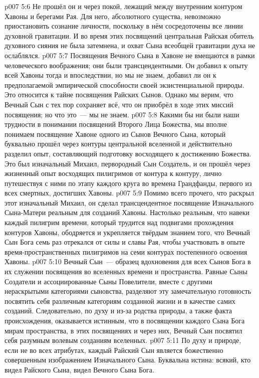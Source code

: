 \vs p007 5:6 Не прошёл он и через покой, лежащий между внутренним контуром Хавоны и берегами Рая. Для него, абсолютного существа, невозможно приостановить сознание личности, поскольку в нём сосредоточены все линии духовной гравитации. И во время этих посвящений центральная Райская обитель духовного сияния не была затемнена, и охват Сына всеобщей гравитации духа не ослаблялся.
\vs p007 5:7 \pc Посвящения Вечного Сына в Хавоне не вмещаются в рамки человеческого воображения; они были трансцендентными. Он добавил к опыту всей Хавоны тогда и впоследствии, но мы не знаем, добавил ли он к предполагаемой эмпирической способности своей экзистенциальной природы. Это относится к тайне посвящения Райских Сынов. Однако мы верим, что Вечный Сын с тех пор сохраняет всё, что он приобрёл в ходе этих миссий посвящения; но что это~--- мы не знаем.
\vs p007 5:8 \pc Какими бы ни были наши трудности в понимании посвящений Второго Лица Божества, мы вполне понимаем посвящение Хавоне одного из Сынов Вечного Сына, который буквально прошёл через контуры центральной вселенной и действительно разделил опыт, составляющий подготовку восходящего к достижению Божества. Это был изначальный Михаил, первородный Сын Создатель, и он прошёл через жизненный опыт восходящих пилигримов от контура к контуру, лично путешествуя с ними по этапу каждого круга во времена Грандфанды, первого из всех смертных, достигших Хавоны.
\vs p007 5:9 Помимо всего прочего, что раскрыл этот изначальный Михаил, он сделал трансцендентное посвящение Изначального Сына\hyp{}Матери реальным для созданий Хавоны. Настолько реальным, что навеки каждый пилигрим времени, который трудится над подвигами прохождения контуров Хавоны, ободряется и укрепляется твёрдым знанием того, что Вечный Сын Бога семь раз отрекался от силы и славы Рая, чтобы участвовать в опыте время\hyp{}пространственных пилигримов на семи контурах постепенного освоения Хавоны.
\vs p007 5:10 \pc Вечный Сын~--- образец вдохновения для всех Сынов Бога в их служении посвящения во вселенных времени и пространства. Равные Сыны Создатели и ассоциированные Сыны Повелители, вместе с другими нераскрытыми категориями сыновства, разделяют эту замечательную готовность посвятить себя различным категориям созданной жизни и в качестве самих созданий. Следовательно, по духу и из-за родства природы, а также факта происхождения, оказывается истинным, что в посвящении каждого Сына Бога мирам пространства, в этих посвящениях и через них, Вечный Сын посвятил себя разумным волевым созданиям вселенных.
\vs p007 5:11 По духу и природе, если не во всех атрибутах, каждый Райский Сын является божественно совершенным изображением Изначального Сына. Буквальна истина: всякий, кто видел Райского Сына, видел Вечного Сына Бога.
